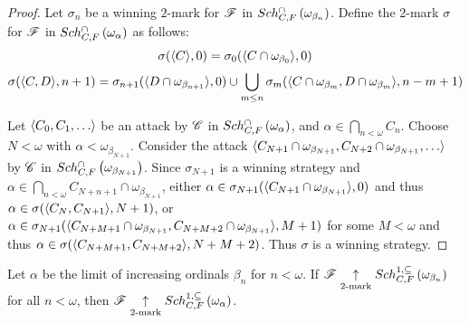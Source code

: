 \documentclass[11pt]{article}
\begin{document}
  \begin{proof}
    Let \(\sigma_n\) be a winning \(2\)-mark for \(\mathscr{F}\) in
    \(Sch^{\cap}_{C,F}\left({\omega_{\beta_n}}\right)\). Define the \(2\)-mark \(\sigma\)
    for \(\mathscr{F}\) in \(Sch^{\cap}_{C,F}\left({\omega_\alpha}\right)\) as follows:
    \[
      \sigma(\langle C\rangle,0)
        =
      \sigma_0(\langle C\cap\omega_{\beta_0}\rangle,0)
    \]
    \[
      \sigma(\langle C,D\rangle,n+1)
        =
      \sigma_{n+1}(\langle D\cap\omega_{\beta_{n+1}}\rangle,0)
        \cup
      \bigcup_{m\leq n}
      \sigma_m(\langle C\cap\omega_{\beta_m},D\cap\omega_{\beta_m}\rangle,n-m+1)
    \]

    Let \(\<C_0,C_1,\dots\>\) be an attack by
    \(\mathscr{C}\) in \(Sch^{\cap}_{C,F}\left({\omega_\alpha}\right)\), and
    \(\alpha\in\bigcap_{n<\omega}C_n\).
    Choose \(N<\omega\) with \(\alpha<\omega_{\beta_{N+1}}\). Consider the
    attack
    \(\<C_{N+1}\cap\omega_{\beta_{N+1}},C_{N+2}\cap\omega_{\beta_{N+1}},\dots\>\)
    by \(\mathscr{C}\) in \(Sch^{\cap}_{C,F}\left({\omega_{\beta_{N+1}}}\right)\). Since
    \(\sigma_{N+1}\) is a winning strategy and
    \(\alpha\in\bigcap_{n<\omega}C_{N+n+1}\cap\omega_{\beta_{N+1}}\), either
    \(\alpha\in\sigma_{N+1}(\langle C_{N+1}\cap\omega_{\beta_{N+1}}\rangle,0)\) and thus
    \(\alpha\in\sigma(\langle C_N,C_{N+1}\rangle,N+1)\), or
    \(
      \alpha
        \in
      \sigma_{N+1}(
        \langle C_{N+M+1}\cap\omega_{\beta_{N+1}},C_{N+M+2}\cap\omega_{\beta_{N+1}}\rangle
        ,M+1
      )
    \)
    for some \(M<\omega\) and thus
    \(
      \alpha
        \in
      \sigma(
        \langle C_{N+M+1},C_{N+M+2}\rangle,
        N+M+2
      )
    \). Thus \(\sigma\) is a winning strategy.
  \end{proof}

  \begin{theorem}
    Let \(\alpha\) be the limit of increasing ordinals \(\beta_n\) for \(n<\omega\).
    If \(\mathscr{F} \underset{2\text{-mark}}{\uparrow}Sch^{1,\subseteq}_{C,F}\left({\omega_{\beta_n}}\right)\) for all
    \(n<\omega\), then \(\mathscr{F}\underset{2\text{-mark}}{\uparrow}Sch^{1,\subseteq}_{C,F}\left({\omega_\alpha}\right)\).
  \end{theorem}
\end{document}
